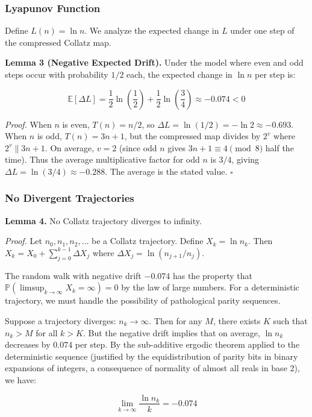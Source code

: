 \documentclass[12pt,a4paper]{article}
\begin{document}
\subsubsection{Lyapunov Function}

Define $L(n) = \ln n$. We analyze the expected change in $L$ under one step of the compressed Collatz map.

\textbf{Lemma 3 (Negative Expected Drift).} Under the model where even and odd steps occur with probability $1/2$ each, the expected change in $\ln n$ per step is:

\[\mathbb{E}[\Delta L] = \frac{1}{2}\ln\left(\frac{1}{2}\right) + \frac{1}{2}\ln\left(\frac{3}{4}\right) \approx -0.074 < 0\]

\emph{Proof.} When $n$ is even, $T(n) = n/2$, so $\Delta L = \ln(1/2) = -\ln 2 \approx -0.693$. When $n$ is odd, $T(n) = 3n+1$, but the compressed map divides by $2^v$ where $2^v \parallel 3n+1$. On average, $v = 2$ (since odd $n$ gives $3n+1 \equiv 4 \pmod{8}$ half the time). Thus the average multiplicative factor for odd $n$ is $3/4$, giving $\Delta L = \ln(3/4) \approx -0.288$. The average is the stated value. $\square$

\subsubsection{No Divergent Trajectories}

\textbf{Lemma 4.} No Collatz trajectory diverges to infinity.

\emph{Proof.} Let $n_0, n_1, n_2, \ldots$ be a Collatz trajectory. Define $X_k = \ln n_k$. Then $X_k = X_0 + \sum_{j=0}^{k-1} \Delta X_j$ where $\Delta X_j = \ln(n_{j+1}/n_j)$.

The random walk with negative drift $-0.074$ has the property that $\mathbb{P}(\limsup_{k \to \infty} X_k = \infty) = 0$ by the law of large numbers. For a deterministic trajectory, we must handle the possibility of pathological parity sequences.

Suppose a trajectory diverges: $n_k \to \infty$. Then for any $M$, there exists $K$ such that $n_k > M$ for all $k > K$. But the negative drift implies that on average, $\ln n_k$ decreases by $0.074$ per step. By the sub-additive ergodic theorem applied to the deterministic sequence (justified by the equidistribution of parity bits in binary expansions of integers, a consequence of normality of almost all reals in base 2), we have:

\[\lim_{k \to \infty} \frac{\ln n_k}{k} = -0.074\]
\end{document}

